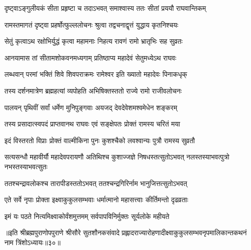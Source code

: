 \twolineshloka
{दृष्ट्वाऽङ्गुलीयकं सीता प्रहृष्टा च तदाऽभवत्}
{समाश्वास्य ततः सीतां प्रययौ राघवान्तिकम्} %

\twolineshloka
{रामस्तमागतं दृष्ट्वा प्रहर्षोत्फुल्ललोचनः}
{श्रुत्वा तद्वचनाद्वृत्तं युद्धाय कृतनिश्चयः} %

\twolineshloka
{सेतुं कृत्वाऽथ रक्षोभिर्युद्धं कृत्वा महामनाः}
{निहत्य रावणं रामो भ्रातृभिः सह सुव्रतः} %

\twolineshloka
{आनयामास तां सीतामशोकवनमध्यगाम्}
{प्रतिष्ठाप्य महादेवं सेतुमध्येऽथ राघवः} %

\twolineshloka
{लब्धवान् परमां भक्तिं शिवे शिवपराक्रमः}
{रामेश्वर इति ख्यातो महादेवः पिनाकधृक्} %

\twolineshloka
{तस्य दर्शनमात्रेण ब्रह्महत्यां व्यपोहति}
{अभिषिक्तस्ततो राज्ये रामो राजीवलोचनः} %

\twolineshloka
{पालयन् पृथिवीं सर्वां धर्मेण मुनिपुङ्गवाः}
{अयजद् देवदेवेशमश्वमेधेन शङ्करम्} %

\twolineshloka
{तस्य प्रसादात्स्वपदं प्राप्तवानथ राघवः}
{एवं सङ्क्षेपतः प्रोक्तं रामस्य चरितं मया} %

\twolineshloka
{इदं विस्तरतो विप्राः प्रोक्तं वाल्मीकिना पुनः}
{कुशश्चैको लवश्वान्यः पुत्रौ रामस्य सुव्रतौ} %

\threelineshloka
{सत्यसन्धौ महावीर्यौ महादेवपरायणौ}
{अतिथिश्च कुशाज्जज्ञे निषधस्तत्सुतोऽभवत्}
{नलस्तस्याभवत्पुत्रो नभस्तस्याभवत्सुतः} %

\twolineshloka
{ततश्चन्द्रावलोकश्च तारापीडस्ततोऽभवत्}
{ततश्चन्द्रगिरिर्नाम भानुजित्तत्सुतोऽभवत्} %

\twolineshloka
{एते सर्वे नृपाः प्रोक्ता इक्ष्वाकुकुलसम्भवाः}
{धर्मात्मानो महासत्त्वाः कीर्तिमन्तो दृढव्रताः} %

\twolineshloka
{इमं यः पठते नित्यमिक्ष्वाकोर्वंशमुत्तमम्}
{सर्वपापविनिर्मुक्तः सूर्यलोके महीयते} %

॥इति श्रीब्रह्मपुराणोपपुराणे श्रीसौरे सुतशौनकसंवादे प्रह्लादराज्यारोहणादीक्ष्वाकुकुलसम्भवनृपमालिकान्तकथनं नाम त्रिंशोऽध्यायः॥३०॥

\closesection